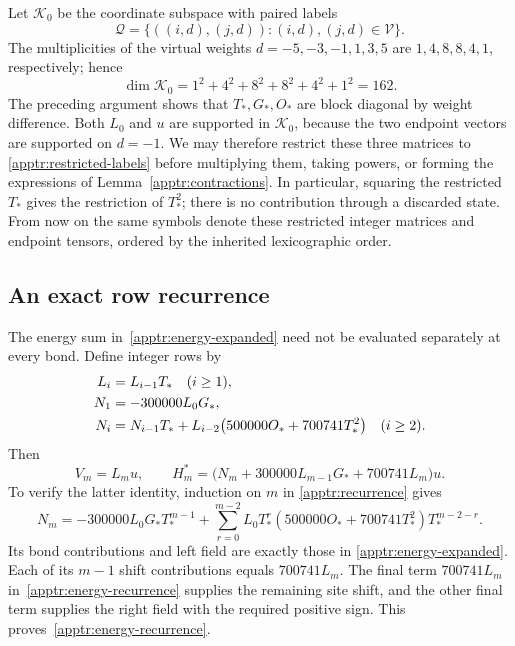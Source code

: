 \documentclass[11pt]{article}
\theoremstyle{remark}
\numberwithin{equation}{section}
\begin{document}
Let $\mathcal K_0$ be the coordinate subspace with paired labels
\begin{equation}\label{apptr:restricted-labels}
 \mathcal Q=\{((i,d),(j,d)):(i,d),(j,d)\in\mathcal V\}.
\end{equation}
The multiplicities of the virtual weights
$d=-5,-3,-1,1,3,5$ are $1,4,8,8,4,1$, respectively; hence
\begin{equation}\label{apptr:restricted-dimension}
 \dim\mathcal K_0=1^2+4^2+8^2+8^2+4^2+1^2=162.
\end{equation}
The preceding argument shows that $T_*,G_*,O_*$ are block diagonal
by weight difference.  Both $L_0$ and $u$ are supported in
$\mathcal K_0$, because the two endpoint vectors are supported on
$d=-1$.  We may therefore restrict these three matrices to
\eqref{apptr:restricted-labels} before multiplying them, taking
powers, or forming the expressions of
Lemma~\ref{apptr:contractions}.  In particular, squaring the
restricted $T_*$ gives the restriction of $T_*^2$; there is no
contribution through a discarded state.  From now on the same
symbols denote these restricted integer matrices and endpoint
tensors, ordered by the inherited lexicographic order.

\subsection{An exact row recurrence}

The energy sum in~\eqref{apptr:energy-expanded} need not be evaluated
separately at every bond.  Define integer rows by
\begin{align}
 L_i&=L_{i-1}T_*\quad(i\ge1),\notag\\
 N_1&=-300000L_0G_*,\notag\\
 N_i&=N_{i-1}T_*+
       L_{i-2}\bigl(500000O_*+700741T_*^2\bigr)
       \quad(i\ge2).
 \label{apptr:recurrence}
\end{align}
Then
\begin{equation}\label{apptr:energy-recurrence}
 V_m=L_mu,\qquad
 H_m^*=\bigl(N_m+300000L_{m-1}G_*+700741L_m\bigr)u.
\end{equation}
To verify the latter identity, induction on $m$ in
\eqref{apptr:recurrence} gives
\begin{equation}\label{apptr:N-expansion}
 N_m=-300000L_0G_*T_*^{m-1}
   +\sum_{r=0}^{m-2}
      L_0T_*^r(500000O_*+700741T_*^2)T_*^{m-2-r}.
\end{equation}
Its bond contributions and left field are exactly those in
\eqref{apptr:energy-expanded}.  Each of its $m-1$ shift
contributions equals $700741L_m$.  The final term $700741L_m$
in~\eqref{apptr:energy-recurrence} supplies the remaining site shift,
and the other final term supplies the right field with the required
positive sign.  This proves~\eqref{apptr:energy-recurrence}.
\end{document}
